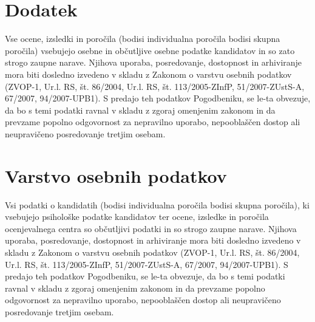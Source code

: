 
\chapter{Dodatek}
Vse ocene, izsledki in poročila (bodisi individualna poročila bodisi skupna poročila) vsebujejo osebne in občutljive osebne podatke kandidatov in so zato strogo zaupne narave. Njihova uporaba, posredovanje, dostopnost in arhiviranje mora biti dosledno izvedeno v skladu z Zakonom o varstvu osebnih podatkov (ZVOP-1, Ur.l. RS, št. 86/2004, Ur.l. RS, št. 113/2005-ZInfP, 51/2007-ZUstS-A, 67/2007, 94/2007-UPB1). S predajo teh podatkov Pogodbeniku, se le-ta obvezuje, da bo s temi podatki ravnal v skladu z zgoraj omenjenim zakonom in da prevzame popolno odgovornost za nepravilno uporabo, nepooblaščen dostop ali neupravičeno posredovanje tretjim osebam.



\chapter{Varstvo osebnih podatkov}
Vsi podatki o kandidatih (bodisi individualna poročila bodisi skupna poročila), ki vsebujejo psihološke podatke kandidatov ter ocene, izsledke in poročila ocenjevalnega centra so občutljivi podatki in so strogo zaupne narave. Njihova uporaba, posredovanje, dostopnost in arhiviranje mora biti dosledno izvedeno v skladu z Zakonom o varstvu osebnih podatkov (ZVOP-1, Ur.l. RS, št. 86/2004, Ur.l. RS, št. 113/2005-ZInfP, 51/2007-ZUstS-A, 67/2007, 94/2007-UPB1). S predajo teh podatkov Pogodbeniku, se le-ta obvezuje, da bo s temi podatki ravnal v skladu z zgoraj omenjenim zakonom in da prevzame popolno odgovornost za nepravilno uporabo, nepooblaščen dostop ali neupravičeno posredovanje tretjim osebam.